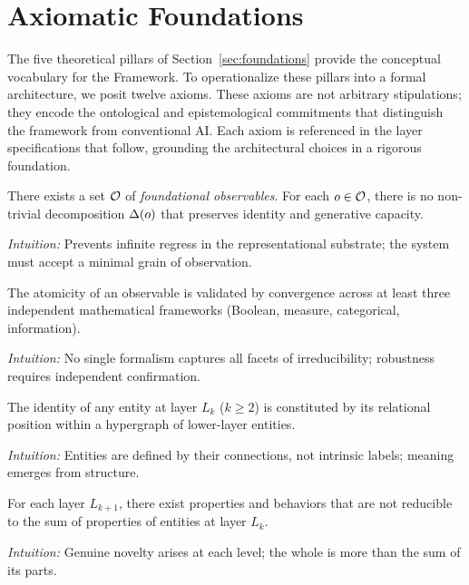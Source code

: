 \section{Axiomatic Foundations}
\label{sec:axioms}

The five theoretical pillars of Section~\ref{sec:foundations} provide the conceptual vocabulary for the \Apeiron{} Framework. To operationalize these pillars into a formal architecture, we posit twelve axioms. These axioms are not arbitrary stipulations; they encode the ontological and epistemological commitments that distinguish the framework from conventional AI. Each axiom is referenced in the layer specifications that follow, grounding the architectural choices in a rigorous foundation.

\begin{axiom}[Irreducibility]\label{ax:irred}
There exists a set $\mathcal{O}$ of \emph{foundational observables}. For each $o \in \mathcal{O}$, there is no non-trivial decomposition $\Delta(o)$ that preserves identity and generative capacity.
\end{axiom}
\textit{Intuition:} Prevents infinite regress in the representational substrate; the system must accept a minimal grain of observation.

\begin{axiom}\label{ax:multi}
The atomicity of an observable is validated by convergence across at least three independent mathematical frameworks (Boolean, measure, categorical, information).
\end{axiom}
\textit{Intuition:} No single formalism captures all facets of irreducibility; robustness requires independent confirmation.

\begin{axiom}\label{ax:relational}
The identity of any entity at layer $L_k$ ($k \ge 2$) is constituted by its relational position within a hypergraph of lower-layer entities.
\end{axiom}
\textit{Intuition:} Entities are defined by their connections, not intrinsic labels; meaning emerges from structure.

\begin{axiom}[Emergence]\label{ax:emergence}
For each layer $L_{k+1}$, there exist properties and behaviors that are not reducible to the sum of properties of entities at layer $L_k$.
\end{axiom}
\textit{Intuition:} Genuine novelty arises at each level; the whole is more than the sum of its parts.

